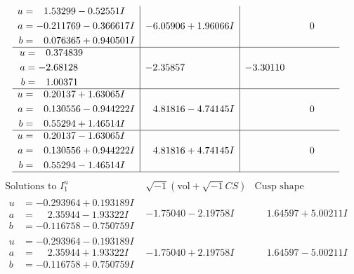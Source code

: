 \documentclass[1p]{elsarticle_modified}
\theoremstyle{definition}
\newcommand{\I}{\sqrt{-1}}
\begin{document}
$$\begin{array}{c|c|c}
\begin{aligned}
u &= \phantom{-}1.53299 - 0.52551 I \\
a &= -0.211769 - 0.366617 I \\
b &= \phantom{-}0.076365 + 0.940501 I\end{aligned}
 & -6.05906 + 1.96066 I & \phantom{-0.000000 } 0 \\ \hline\begin{aligned}
u &= \phantom{-}0.374839\phantom{ +0.000000I} \\
a &= -2.68128\phantom{ +0.000000I} \\
b &= \phantom{-}1.00371\phantom{ +0.000000I}\end{aligned}
 & -2.35857\phantom{ +0.000000I} & -3.30110\phantom{ +0.000000I} \\ \hline\begin{aligned}
u &= \phantom{-}0.20137 + 1.63065 I \\
a &= \phantom{-}0.130556 - 0.944222 I \\
b &= \phantom{-}0.55294 + 1.46514 I\end{aligned}
 & \phantom{-}4.81816 - 4.74145 I & \phantom{-0.000000 } 0 \\ \hline\begin{aligned}
u &= \phantom{-}0.20137 - 1.63065 I \\
a &= \phantom{-}0.130556 + 0.944222 I \\
b &= \phantom{-}0.55294 - 1.46514 I\end{aligned}
 & \phantom{-}4.81816 + 4.74145 I & \phantom{-0.000000 } 0\\
 \hline 
 \end{array}$$\newpage$$\begin{array}{c|c|c}  
\text{Solutions to }I^u_{1}& \I (\text{vol} + \sqrt{-1}CS) & \text{Cusp shape}\\
 \hline 
\begin{aligned}
u &= -0.293964 + 0.193189 I \\
a &= \phantom{-}2.35944 - 1.93322 I \\
b &= -0.116758 - 0.750759 I\end{aligned}
 & -1.75040 - 2.19758 I & \phantom{-}1.64597 + 5.00211 I \\ \hline\begin{aligned}
u &= -0.293964 - 0.193189 I \\
a &= \phantom{-}2.35944 + 1.93322 I \\
b &= -0.116758 + 0.750759 I\end{aligned}
 & -1.75040 + 2.19758 I & \phantom{-}1.64597 - 5.00211 I \\ \hline\begin{aligned}

\end{aligned}
\end{array}$$
\end{document}

